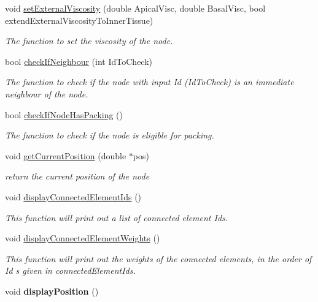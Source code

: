 \begin{DoxyCompactItemize}
\item 
void \hyperlink{classNode_adae4720965b558b075a91af4cf742b2a}{set\+External\+Viscosity} (double Apical\+Visc, double Basal\+Visc, bool extend\+External\+Viscosity\+To\+Inner\+Tissue)
\begin{DoxyCompactList}\small\item\em The function to set the viscosity of the node. \end{DoxyCompactList}\item 
bool \hyperlink{classNode_a7dc5a9838a0a1963e58f648c5f7cb635}{check\+If\+Neighbour} (int Id\+To\+Check)
\begin{DoxyCompactList}\small\item\em The function to check if the node with input Id (Id\+To\+Check) is an immediate neighbour of the node. \end{DoxyCompactList}\item 
bool \hyperlink{classNode_a1d80e6f467d8ca919872b6e47a882dd5}{check\+If\+Node\+Has\+Packing} ()
\begin{DoxyCompactList}\small\item\em The function to check if the node is eligible for packing. \end{DoxyCompactList}\item 
void \hyperlink{classNode_ae4a2d9e601432a998efe24e1ac4a86cd}{get\+Current\+Position} (double $\ast$pos)
\begin{DoxyCompactList}\small\item\em return the current position of the node \end{DoxyCompactList}\item 
void \hyperlink{classNode_a3030a518aa97bd50060b8733e87540f7}{display\+Connected\+Element\+Ids} ()
\begin{DoxyCompactList}\small\item\em This function will print out a list of connected element Id\textquotesingle{}s. \end{DoxyCompactList}\item 
void \hyperlink{classNode_a755e8c3d76e7f1f0ab364fc3d4da3a9a}{display\+Connected\+Element\+Weights} ()
\begin{DoxyCompactList}\small\item\em This function will print out the weights of the connected elements, in the order of Id s given in connected\+Element\+Ids. \end{DoxyCompactList}\item 
\hypertarget{classNode_a39d2419d4de14f0d0ecffc7c7809e705}{}void {\bfseries display\+Position} ()\label{classNode_a39d2419d4de14f0d0ecffc7c7809e705}


\end{DoxyCompactItemize}
